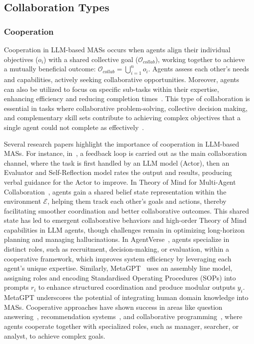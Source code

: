 \documentclass[acmsmall,nonacm]{acmart}
\begin{document}
    \subsection{Collaboration Types}

        \subsubsection{Cooperation}
            Cooperation in LLM-based MASs occurs when agents align their individual objectives ($o_i$) with a shared collective goal ($\mathcal{O}_{collab}$), working together to achieve a mutually beneficial outcome: $\mathcal{O}_{collab} = \bigcup_{i=1}^n o_i$. 
            Agents assess each other’s needs and capabilities, actively seeking collaborative opportunities. Moreover, agents can also be utilized to focus on specific sub-tasks within their expertise, enhancing efficiency and reducing completion times~\cite{chen2024agentverse}. This type of collaboration is essential in tasks where collaborative problem-solving, collective decision making, and complementary skill sets contribute to achieving complex objectives that a single agent could not complete as effectively~\cite{dafoe2020openproblemscooperativeai,das2023enabling,Conitzer_Oesterheld_2024}.

            Several research papers highlight the importance of cooperation in LLM-based MASs. For instance, in~\cite{shinn2023reflexion}, a feedback loop is carried out as the main collaboration channel, where the task is first handled by an LLM model (Actor), then an Evaluator and Self-Reflection model rates the output and results, producing verbal guidance for the Actor to improve. In Theory of Mind for Multi-Agent Collaboration~\cite{li-etal-2023-theory}, agents gain a shared belief state representation within the environment $\mathcal{E}$, helping them track each other’s goals and actions, thereby facilitating smoother coordination and better collaborative outcomes. This shared state has led to emergent collaborative behaviors and high-order Theory of Mind capabilities in LLM agents, though challenges remain in optimizing long-horizon planning and managing hallucinations. In AgentVerse~\cite{chen2024agentverse}, agents specialize in distinct roles, such as recruitment, decision-making, or evaluation, within a cooperative framework, which improves system efficiency by leveraging each agent’s unique expertise. Similarly, MetaGPT~\cite{hong2024metagpt} uses an assembly line model, assigning roles and encoding Standardised Operating Procedures (SOPs) into prompts $r_i$ to enhance structured coordination and produce modular outputs $y_i$. MetaGPT underscores the potential of integrating human domain knowledge into MASs. Cooperative approaches have shown success in areas like question answering~\cite{he-etal-2023-lego}, recommendation systems~\cite{10.1145/3626772.3657669}, and collaborative programming~\cite{islam-etal-2024-mapcoder}, where agents cooperate together with specialized roles, such as manager, searcher, or analyst, to achieve complex goals.
\end{document}
